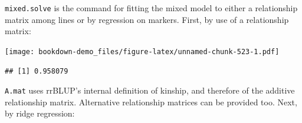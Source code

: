 \documentclass[
]{book}
\newenvironment{Shaded}{\begin{snugshade}}{\end{snugshade}}
\newcommand{\AttributeTok}[1]{\textcolor[rgb]{0.77,0.63,0.00}{#1}}
\newcommand{\ConstantTok}[1]{\textcolor[rgb]{0.00,0.00,0.00}{#1}}
\newcommand{\DecValTok}[1]{\textcolor[rgb]{0.00,0.00,0.81}{#1}}
\newcommand{\FloatTok}[1]{\textcolor[rgb]{0.00,0.00,0.81}{#1}}
\newcommand{\FunctionTok}[1]{\textcolor[rgb]{0.00,0.00,0.00}{#1}}
\newcommand{\NormalTok}[1]{#1}
\newcommand{\OtherTok}[1]{\textcolor[rgb]{0.56,0.35,0.01}{#1}}
\newcommand{\SpecialCharTok}[1]{\textcolor[rgb]{0.00,0.00,0.00}{#1}}
\newcommand{\StringTok}[1]{\textcolor[rgb]{0.31,0.60,0.02}{#1}}
\begin{document}
\texttt{mixed.solve} is the command for fitting the mixed model to either a relationship matrix
among lines or by regression on markers. First, by use of a relationship matrix:

\begin{Shaded}
\end{Shaded}

\texttt{[image: bookdown-demo\_files/figure-latex/unnamed-chunk-523-1.pdf]}

\begin{Shaded}
\end{Shaded}

\begin{verbatim}
## [1] 0.958079
\end{verbatim}

\texttt{A.mat} uses rrBLUP's internal definition of kinship, and therefore of the additive relationship matrix. Alternative relationship matrices can be provided too. Next, by ridge regression:

\begin{Shaded}
\end{Shaded}
\end{document}
